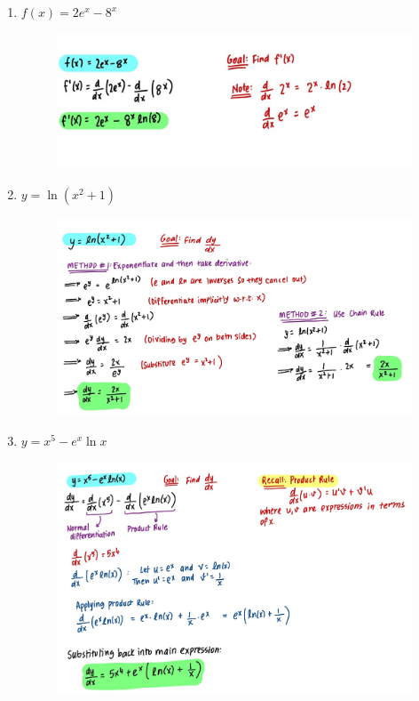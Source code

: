 \documentclass{article}
\begin{document}
\begin{enumerate}
    \item $f(x) = 2e^x - 8^x$
    \begin{figure}[H]
        \centering
        \includegraphics[width=\linewidth]{Q1.1.jpg}
        \label{fig:Q1.1}
    \end{figure}
    \item $y = \ln(x^2 + 1)$
    \begin{figure}[H]
        \centering
        \includegraphics[width=\linewidth]{Q1.6.jpg}
        \label{fig:Q1.6}
    \end{figure}
    \newpage
    \item $y = x^5 -e^x \ln x$
    \begin{figure}[H]
        \centering
        \includegraphics[width=0.9\linewidth]{Q1.2.jpg}

\end{figure}
\end{enumerate}
\end{document}
